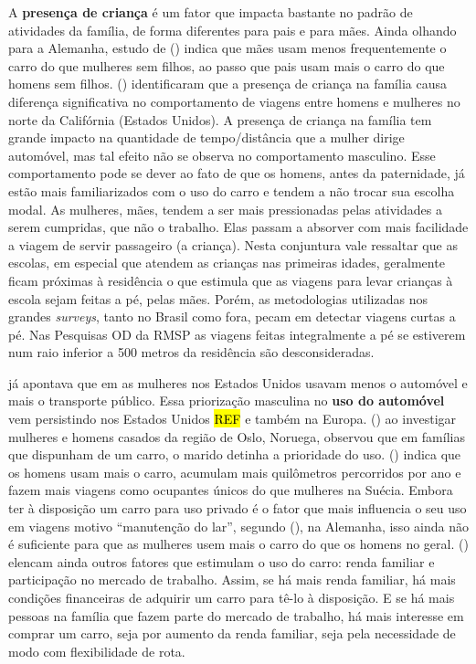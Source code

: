 A \textbf{presença de criança} é um fator que impacta bastante no padrão de atividades da família, de forma diferentes para pais e para mães. Ainda olhando para a Alemanha, estudo de  (\citeyear{BEST2005}) indica que mães usam menos frequentemente o carro do que mulheres sem filhos, ao passo que pais usam mais o carro do que homens sem filhos.
 (\citeyear{GODDARD2006}) identificaram que a presença de criança na família causa diferença significativa no comportamento de viagens entre homens e mulheres no norte da Califórnia (Estados Unidos). A presença de criança na família tem grande impacto na quantidade de tempo/distância que a mulher dirige automóvel, mas tal efeito não se observa no comportamento masculino. 
Esse comportamento pode se dever ao fato de que os homens, antes da paternidade, já estão mais familiarizados com o uso do carro e tendem a não trocar sua escolha modal. 
As mulheres, mães, tendem a ser mais pressionadas pelas atividades a serem cumpridas, que não o trabalho. Elas passam a absorver com mais facilidade a viagem de servir passageiro (a criança). Nesta conjuntura vale ressaltar que as escolas, em especial que atendem as crianças nas primeiras idades, geralmente ficam próximas à residência o que estimula que as viagens para levar crianças à escola sejam feitas a pé, pelas mães. Porém, as metodologias utilizadas nos grandes \emph{surveys}, tanto no Brasil como fora, pecam em detectar viagens curtas a pé. Nas Pesquisas OD da RMSP as viagens feitas integralmente a pé se estiverem num raio inferior a 500 metros da residência são desconsideradas.





 já apontava que em \citeyear{FOX1983} as mulheres nos Estados Unidos usavam menos o automóvel e mais o transporte público. Essa priorização masculina no \textbf{uso do automóvel} vem persistindo nos Estados Unidos \hl{REF} e também na Europa.  (\citeyear{HJORTHOL2000}) ao investigar mulheres e homens casados da região de Oslo, Noruega, observou que em famílias que dispunham de um carro, o marido detinha a prioridade do uso.  (\citeyear{POLK2003}) indica que os homens usam mais o carro, acumulam mais quilômetros percorridos por ano e fazem mais viagens como ocupantes únicos do que mulheres na Suécia.
Embora ter à disposição um carro para uso privado é o fator que mais influencia o seu uso em viagens motivo ``manutenção do lar'', segundo  (\citeyear{BEST2005}), na Alemanha, isso ainda não é suficiente para que as mulheres usem mais o carro do que os homens no geral. 
 (\citeyear{BEST2005}) elencam ainda outros fatores que estimulam o uso do carro: renda familiar e participação no mercado de trabalho. Assim, se há mais renda familiar, há mais condições financeiras de adquirir um carro para tê-lo à disposição. E se há mais pessoas na família que fazem parte do mercado de trabalho, há mais interesse em comprar um carro, seja por aumento da renda familiar, seja pela necessidade de modo com flexibilidade de rota.



